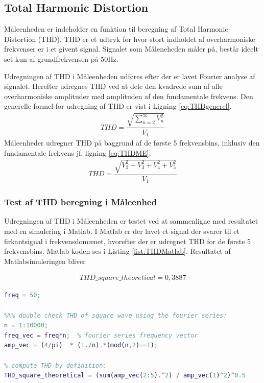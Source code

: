 
\subsection{Total Harmonic Distortion}

Måleenheden er indeholder en funktion til beregning af Total Harmonic Distortion (THD). THD er et udtryk for hvor stort indholdet af overharmoniske frekvenser er i et givent signal. Signalet som Måleneheden måler på, består ideelt set kun af grundfrekvensen på 50Hz. 

Udregningen af THD i Måleenheden udføres efter der er lavet Fourier analyse af signalet. Herefter udregnes THD ved at dele den kvadrede sum af alle overharmoniske amplituder med amplituden af den fundamentale frekvens. Den generelle formel for udregning af THD er vist i Ligning \ref{eq:THDgenerel}.
\begin{align}
	THD = \dfrac{\sqrt{\sum_{n=2}^{\infty}V_n^{2}}}{V_{1}}
	\label{eq:THDgenerel}
\end{align}
Måleenheder udregner THD på baggrund af de første 5 frekvensbins, inklusiv den fundamentale frekvens jf. ligning \ref{eq:THDME}.
\begin{align}
THD = \dfrac{\sqrt{V_2^{2}+V_3^{2}+V_4^{2}+V_5^{2}}}{V_{1}}
\label{eq:THDME}
\end{align}

\subsubsection{Test af THD beregning i Måleenhed}
\label{sek:THD}


Udregningen af THD i Måleenheden er testet ved at sammenligne med resultatet med en simulering i Matlab. I Matlab er der lavet et signal der svarer til et firkantsignal i frekvensdomænet, hvorefter der er udregnet THD for de første 5 frekvensbins. Matlab koden ses i Listing \ref{list:THDMatlab}. Resultatet af Matlabsimuleringen bliver

\begin{align}
	THD\_square\_theoretical = 0,3887
\end{align}



\begin{lstlisting}[language=Matlab] 
freq = 50;

%%% double check THD of square wave using the fourier series:
n = 1:10000;
freq_vec = freq*n;  % fourier series frequency vector
amp_vec = (4/pi)  * (1./n).*(mod(n,2)==1);

% compute THD by definition:
THD_square_theoretical = (sum(amp_vec(2:5).^2) / amp_vec(1)^2)^0.5
\end{lstlisting}



